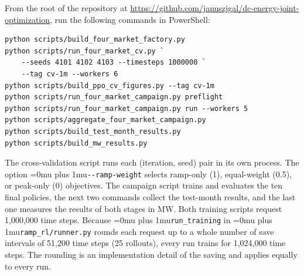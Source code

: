 \documentclass{UNCC-thesis}
\newcommand{\codepath}[1]{{\Urlmuskip=0mu plus 1mu\relax\nolinkurl{#1}}}
\begin{document}
From the root of the repository at
\mbox{\url{https://github.com/januszjgal/dc-energy-joint-optimization}}, run the following commands in
PowerShell:
{\small
\begin{verbatim}
python scripts/build_four_market_factory.py
python scripts/run_four_market_cv.py `
    --seeds 4101 4102 4103 --timesteps 1000000 `
    --tag cv-1m --workers 6
python scripts/build_ppo_cv_figures.py --tag cv-1m
python scripts/run_four_market_campaign.py preflight
python scripts/run_four_market_campaign.py run --workers 5
python scripts/aggregate_four_market_campaign.py
python scripts/build_test_month_results.py
python scripts/build_mw_results.py
\end{verbatim}
}
The cross-validation script runs each (iteration, seed) pair in its own process.
The option
\codepath{--ramp-weight} selects ramp-only (1), equal-weight (0.5), or
peak-only (0) objectives. The campaign script trains and evaluates the ten
final policies, the next two commands collect the test-month results, and the last one
measures the results of both stages in MW. Both training
scripts request 1,000,000 time steps. Because \codepath{run_training} in
\codepath{ramp_rl/runner.py} rounds each request up to a whole number of save intervals of
51,200 time steps (25 rollouts), every run trains for 1,024,000 time steps. The rounding is an
implementation detail of the saving and applies equally to every run.
\end{document}
